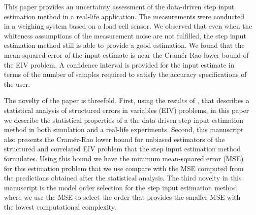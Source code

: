This paper provides an uncertainty assessment of the data-driven step input estimation method in a real-life application.
The measurements were conducted in a weighing system based on a load cell sensor.
We observed that even when the whiteness assumptions of the measurement noise are not fulfilled, the step input estimation method still is able to provide a good estimation. 
We found that the mean squared error of the input estimate is near the Cram\'er-Rao lower bound of the EIV problem.
A confidence interval is provided for the input estimate in terms of the number of samples required to satisfy the accuracy specifications of the user. 

The novelty of the paper is threefold.
First, using the results of \cite{Quintana19}, that describes a statistical analysis of structured errors in variables (EIV) problems, in this paper we describe the statistical properties of a the data-driven step input estimation method in both simulation and a real-life experiments.
Second, this manuscript also presents the Cram\'er-Rao lower bound for unbiased estimators of the structured and correlated EIV problem that the step input estimation method formulates.
Using this bound we have the minimum mean-squared error (MSE) for this estimation problem that we use compare with the MSE computed from the predictions obtained after the statistical analysis.
The third novelty in this manuscript is the model order selection for the step input estimation method where we use the MSE to select the order that provides the smaller MSE with the lowest computational complexity.


 
 
 
 
 
 
\newpage
